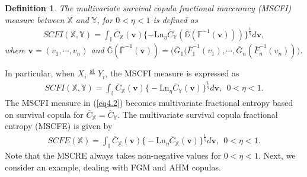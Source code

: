 \documentclass[12pt, a4paper]{article}
\numberwithin{equation}{section}
\newtheorem{definition}{Definition}[section]
\begin{document}
\begin{definition}
The multivariate survival copula fractional  inaccuracy (MSCFI) measure between $\mathbb{X}$ and $\mathbb{Y}$, for $0<\eta<1$ is defined as 
\begin{align}\label{eq4.1}
SCFI(\mathbb{X},\mathbb{Y})=\int_{\mathbb I}\overline{C}_\mathbb{X}(\textbf{v})\{-\mathrm{Ln}_\eta \overline{C}_\mathbb{Y}(\overline{\mathbb{G}}(\mathbb{\mathbb{F}}^{-1}(\textbf{v})))\}^{\frac{1}{\eta}}d\textbf{v},
\end{align}
where $\textbf{v}=(v_1,\cdots,v_n)$ and $\overline{\mathbb{G}}(\overline{\mathbb{F}}^{-1}(\textbf{v}))=\Big(\overline{G}_1(\overline{F}^{-1}_1(v_1),\cdots,\overline{G}_n(\overline{F}^{-1}_n(v_n))\Big)$.
\end{definition}
In particular, when $X_i\overset{\mathrm{st}}{=}Y_i$, the MSCFI measure is expressed as 
\begin{align}\label{eq4.2}
SCFI(\mathbb{X},\mathbb{Y})=\int_{\mathbb I}\overline C_\mathbb{X}(\textbf{v})\big\{-\mathrm{Ln}_\eta \overline C_\mathbb{Y}(\textbf{v})\big\}^{\frac{1}{\eta}}d\textbf{v},~~0<\eta<1.
\end{align} 
The MSCFI measure in (\ref{eq4.2}) becomes multivariate fractional entropy based on survival copula for $\overline C_\mathbb{X}=\overline C_\mathbb{Y}$. The multivariate survival copula fractional entropy (MSCFE)  is given by 
\begin{align}\label{eq4.3}
SCFE(\mathbb{X})=\int_{\mathbb I}\overline C_\mathbb{X}(\textbf{v})\big\{-\mathrm{Ln}_\eta\overline C_\mathbb{X}(\textbf{v})\big\}^{\frac{1}{\eta}}d\textbf{v},~~0<\eta<1.
\end{align} 
Note that the MSCRE always takes non-negative values for $0<\eta<1$. Next, we consider an example, dealing with FGM and AHM copulas.
\end{document}
